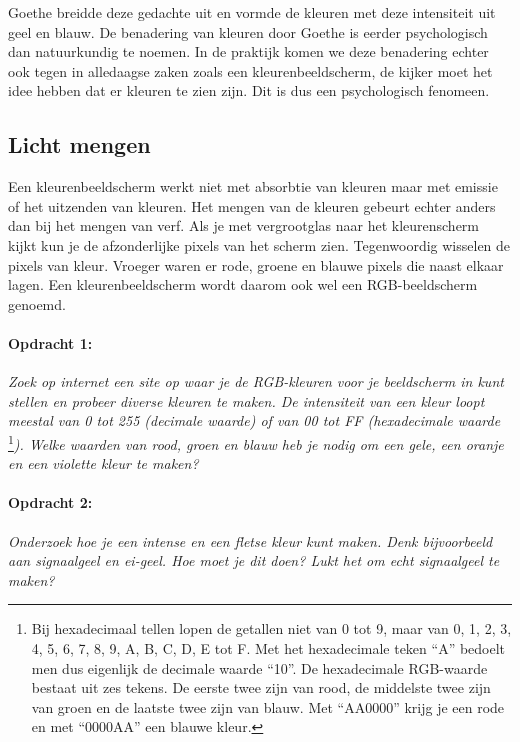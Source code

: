 Goethe breidde deze gedachte uit en vormde de kleuren met deze intensiteit
uit geel en blauw. De benadering van kleuren door Goethe is eerder
psychologisch dan natuurkundig te noemen. In de praktijk komen we
deze benadering echter ook tegen in alledaagse zaken zoals een kleurenbeeldscherm,
de kijker moet het idee hebben dat er kleuren te zien zijn. Dit is
dus een psychologisch fenomeen. 


\subsection{Licht mengen}

Een kleurenbeeldscherm werkt niet met absorbtie van kleuren maar met
emissie of het uitzenden van kleuren. Het mengen van de kleuren gebeurt
echter anders dan bij het mengen van verf. Als je met vergrootglas
naar het kleurenscherm kijkt kun je de afzonderlijke pixels van het
scherm zien. Tegenwoordig wisselen de pixels van kleur. Vroeger waren
er rode, groene en blauwe pixels die naast elkaar lagen. Een kleurenbeeldscherm
wordt daarom ook wel een RGB-beeldscherm genoemd.


\paragraph*{Opdracht 1:}

\emph{Zoek op internet een site op waar je de RGB-kleuren voor je
beeldscherm in kunt stellen en probeer diverse kleuren te maken. De
intensiteit van een kleur loopt meestal van 0 tot 255 (decimale waarde)
of van 00 tot FF (hexadecimale waarde} \footnote{Bij hexadecimaal tellen
lopen de getallen niet van 0 tot 9, maar van 0, 1, 2, 3, 4, 5, 6, 7, 8,
9, A, B, C, D, E tot F. Met het hexadecimale teken ``A'' bedoelt men dus
eigenlijk de decimale waarde ``10''. De hexadecimale RGB-waarde bestaat
uit zes tekens. De eerste twee zijn van rood, de middelste twee zijn van
groen en de laatste twee zijn van blauw. Met ``AA0000'' krijg je een
rode en met ``0000AA'' een blauwe kleur.}\emph{). Welke waarden van
rood, groen en blauw heb je nodig om een gele, een oranje en een
violette kleur te maken?}


\paragraph*{Opdracht 2:}

\emph{Onderzoek hoe je een intense en een fletse kleur kunt maken.
Denk bijvoorbeeld aan signaalgeel en ei-geel. Hoe moet je dit doen?
Lukt het om echt signaalgeel te maken?}


